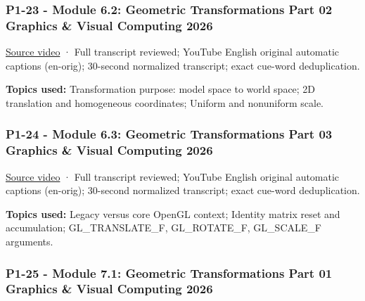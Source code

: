 \subsubsection{P1-23 - Module 6.2: Geometric Transformations Part 02 Graphics \& Visual Computing 2026}\label{04-visual-computing-ii-ch036-p1-23---module-6.2-geometric-transformations-part-02-graphics-visual-computing-2026}

\hypertarget{04-visual-computing-ii-ch036-p1-23---module-6.2-geometric-transformations-part-02-graphics-visual-computing-2026}{}

\href{https://www.youtube.com/watch?v=Utop5s8YRM4}{Source video} · Full transcript reviewed; YouTube English original automatic captions (en-orig); 30-second normalized transcript; exact cue-word deduplication.

\textbf{Topics used:} Transformation purpose: model space to world space; 2D translation and homogeneous coordinates; Uniform and nonuniform scale.

\subsubsection{P1-24 - Module 6.3: Geometric Transformations Part 03 Graphics \& Visual Computing 2026}\label{04-visual-computing-ii-ch036-p1-24---module-6.3-geometric-transformations-part-03-graphics-visual-computing-2026}

\hypertarget{04-visual-computing-ii-ch036-p1-24---module-6.3-geometric-transformations-part-03-graphics-visual-computing-2026}{}

\href{https://www.youtube.com/watch?v=CeHVh4oSX6g}{Source video} · Full transcript reviewed; YouTube English original automatic captions (en-orig); 30-second normalized transcript; exact cue-word deduplication.

\textbf{Topics used:} Legacy versus core OpenGL context; Identity matrix reset and accumulation; GL\_TRANSLATE\_F, GL\_ROTATE\_F, GL\_SCALE\_F arguments.

\subsubsection{P1-25 - Module 7.1: Geometric Transformations Part 01 Graphics \& Visual Computing 2026}\label{04-visual-computing-ii-ch036-p1-25---module-7.1-geometric-transformations-part-01-graphics-visual-computing-2026}

\hypertarget{04-visual-computing-ii-ch036-p1-25---module-7.1-geometric-transformations-part-01-graphics-visual-computing-2026}{}

